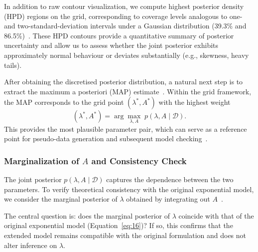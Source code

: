In addition to raw contour visualization, we compute highest posterior density (HPD) regions on the grid, corresponding to coverage levels analogous to one- and two-standard-deviation intervals under a Gaussian distribution (39.3\% and 86.5\%)~\cite{kocev2021modeling}. These HPD contours provide a quantitative summary of posterior uncertainty and allow us to assess whether the joint posterior exhibits approximately normal behaviour or deviates substantially (e.g., skewness, heavy tails).

After obtaining the discretised posterior distribution, a natural next step is to extract the maximum a posteriori (MAP) estimate~\cite{gelman1995bayesian}. Within the grid framework, the MAP corresponds to the grid point $(\lambda^*, A^*)$ with the highest weight
\begin{equation}
    (\lambda^*, A^*) = \arg\max_{\lambda,A} \; p(\lambda,A \mid \mathcal D).
\end{equation}
This provides the most plausible parameter pair, which can serve as a reference point for pseudo-data generation and subsequent model checking~\cite{robert2007bayesian, gelman1995bayesian}.



\subsubsection{Marginalization of \texorpdfstring{$A$}{A} and Consistency Check}
\label{边际化章节}
The joint posterior $p(\lambda, A \mid \mathcal D)$ captures the dependence between the two parameters. To verify theoretical consistency with the original exponential model, we consider the marginal posterior of $\lambda$ obtained by integrating out $A$~\cite{gelman1995bayesian}.   

The central question is: does the marginal posterior of $\lambda$ coincide with that of the original exponential model (Equation~\ref{eq:16})? If so, this confirms that the extended model remains compatible with the original formulation and does not alter inference on $\lambda$.

